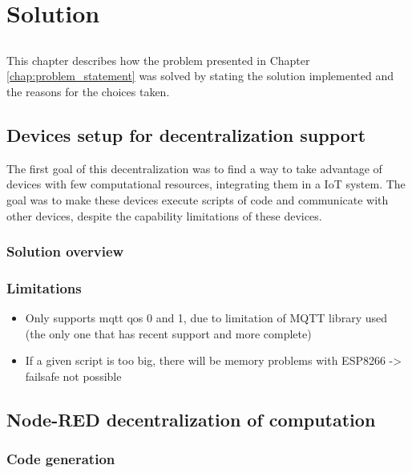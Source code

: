 \chapter{Solution} \label{chap:solution}

\section*{}

This chapter describes how the problem presented in Chapter \ref{chap:problem_statement} was solved by stating the solution implemented and the reasons for the choices taken.  

\section{Devices setup for decentralization support}\label{sec:devices_decentralization}

The first goal of this decentralization was to find a way to take advantage of devices with few computational resources, integrating them in a IoT system. The goal was to make these devices execute scripts of code and communicate with other devices, despite the capability limitations of these devices.

\subsection{Solution overview}

\subsection{Limitations}

\begin{itemize}
    \item Only supports mqtt qos 0 and 1, due to limitation of MQTT library used (the only one that has recent support and more complete)
    \item If a given script is too big, there will be memory problems with ESP8266 -> failsafe not possible
\end{itemize}

\section{Node-RED decentralization of computation}\label{sec:node_red_decentralization}

\subsection{Code generation}

